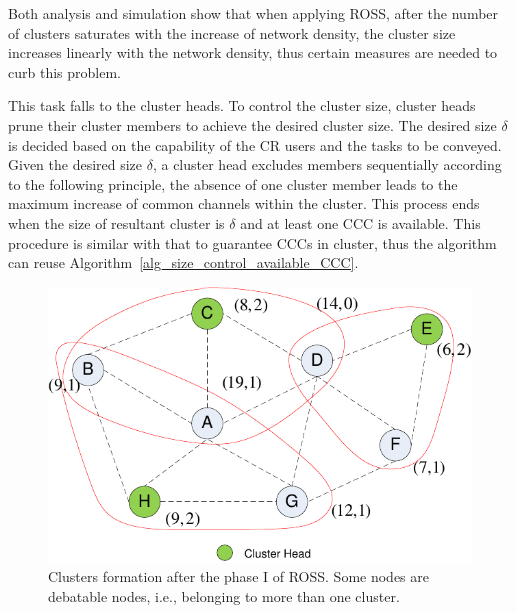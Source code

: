\documentclass[10pt,journal,compsoc]{IEEEtran}
\theoremstyle{mytheoremstyle}
\theoremstyle{mytheoremstyle}
\theoremstyle{mytheoremstyle}
\newcommand{\ie}{i.e., }
\begin{document}
Both analysis and simulation show that when applying ROSS, after the number of clusters saturates with the increase of network density, the cluster size increases linearly with the network density, thus certain measures are needed to curb this problem.

This task falls to the cluster heads.
To control the cluster size, cluster heads prune their cluster members to achieve the desired cluster size.
The desired size $\delta$ is decided based on the capability of the CR users and the tasks to be conveyed.
Given the desired size $\delta$, a cluster head excludes members sequentially according to the following principle, the absence of one cluster member leads to the maximum increase of common channels within the cluster.
This process ends when the size of resultant cluster is $\delta$ and at least one CCC is available.
This procedure is similar with that to guarantee CCCs in cluster, thus the algorithm can reuse Algorithm~\ref{alg_size_control_available_CCC}.








\begin{figure}[ht!]
  \centering
  \includegraphics[width=0.5\linewidth]{figure2.pdf}
  \caption{Clusters formation after the phase I of ROSS. Some nodes are debatable nodes, \ie belonging to more than one cluster.}
  \label{fig2}
\end{figure}
\end{document}
